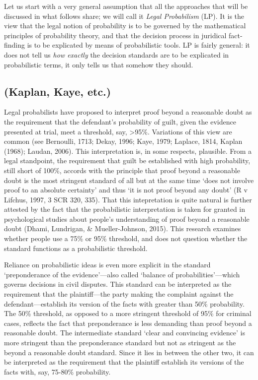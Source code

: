 \documentclass[10pt,dvipsnames,enabledeprecatedfontcommands]{scrartcl}
\begin{document}
Let us start with a very general assumption that all the approaches that
will be discussed in what follows share; we will call it
\emph{Legal Probabilism} (LP). It is the view that the legal notion of
probability is to be governed by the mathematical principles of
probability theory, and that the decision process in juridical
fact-finding is to be explicated by means of probabilistic tools. LP is
fairly general: it does not tell us \emph{ how exactly } the decision
standards are to be explicated in probabilistic terms, it only tells us
that somehow they should.

\subsection{(Kaplan, Kaye, etc.)}\label{kaplan-kaye-etc.}

Legal probabilists have proposed to interpret proof beyond a reasonable
doubt as the requirement that the defendant's probability of guilt,
given the evidence presented at trial, meet a threshold, say,
\textgreater{}95\%. Variations of this view are common (see Bernoulli,
1713; Dekay, 1996; Kaye, 1979; Laplace, 1814, Kaplan (1968); Laudan,
2006). This interpretation is, in some respects, plausible. From a legal
standpoint, the requirement that guilt be established with high
probability, still short of 100\%, accords with the principle that proof
beyond a reasonable doubt is the most stringent standard of all but at
the same time `does not involve proof to an absolute certainty' and thus
`it is not proof beyond any doubt' (R v Lifchus, 1997, 3 SCR 320, 335).
That this intepretation is quite natural is further attested by the fact
that the probabilistic interpretation is taken for granted in
psychological studies about people's understanding of proof beyond a
reasonable doubt (Dhami, Lundrigan, \& Mueller-Johnson, 2015). This
research examines whether people use a 75\% or 95\% threshold, and does
not question whether the standard functions as a probabilistic
threshold.

Reliance on probabilistic ideas is even more explicit in the standard
`preponderance of the evidence'---also called `balance of
probabilities'---which governs decisions in civil disputes. This
standard can be interpreted as the requirement that the plaintiff---the
party making the complaint against the defendant---establish its version
of the facts with greater than 50\% probability. The 50\% threshold, as
opposed to a more stringent threshold of 95\% for criminal cases,
reflects the fact that preponderance is less demanding than proof beyond
a reasonable doubt. The intermediate standard `clear and convincing
evidence' is more stringent than the preponderance standard but not as
stringent as the beyond a reasonable doubt standard. Since it lies in
between the other two, it can be interpreted as the requirement that the
plaintiff establish its versions of the facts with, say, 75-80\%
probability.
\end{document}
